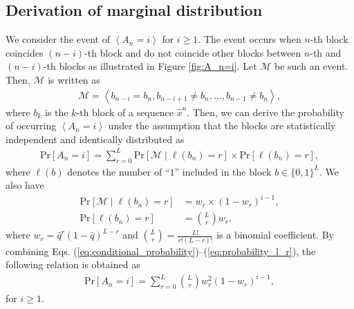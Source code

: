 \documentclass[dvipdfmx,english]{ampmt} %
\begin{document}
\subsection{Derivation of marginal distribution}
We consider the event of $\left< A_n=i \right>$ for $i\geq 1$. The event occurs when $n$-th block coincides $(n-i)$-th block and do not coincide other blocks between $n$-th and $(n-i)$-th blocks as illustrated in Figure \ref{fig:A_n=i}. Let $\mathcal{M}$ be such an event. Then, $\mathcal{M}$ is written as
\begin{align}
  \mathcal{M} = \left< b_{n-i} = b_{n}, b_{n-i+1} \neq b_{n} , \dots, b_{n-1} \neq b_{n}  \right>,
\end{align}
where $b_k$ is the $k$-th block of a sequence $\hat{x}^n$.
Then, we can derive the probability of occurring $\left< A_n = i \right>$ under the assumption that the blocks are statistically independent and identically distributed as
\begin{align}
  \label{eq:conditional_probability}
  \mathrm{Pr}[A_n=i] = \sum_{r=0}^{L} \mathrm{Pr}[\mathcal{M} \mid \ell(b_n) = r] \times \mathrm{Pr} [\ell(b_n) = r],
\end{align}
where $\ell(b)$ denotes the number of ``$1$'' included in the block $b \in \{0,1\}^L$. We also have
\begin{align}
  \mathrm{Pr}[\mathcal{M} \mid \ell(b_n) = r] &= w_r \times ( 1 - w_r )^{i-1},\label{eq:probability_M_mid} \\
  \mathrm{Pr} [\ell(b_n) = r] &= \binom{L}{r} w_r, \label{eq:probability_l_r}
\end{align}
where $w_r = \hat{q}^r (1-\hat{q})^{L-r}$ and $\binom{L}{r} = \frac{L!}{r!(L-r)!}$ is a binomial coefficient. 
%
By combining Eqs. (\ref{eq:conditional_probability})--(\ref{eq:probability_l_r}), the following relation is obtained as
\begin{align}\label{eq:A_n=i}
  \mathrm{Pr}[A_n=i] = \sum_{r=0}^{L} \binom{L}{r} w_r^2 ( 1 - w_r )^{i-1},
\end{align} 
for $i\geq 1$.
%
\end{document}
